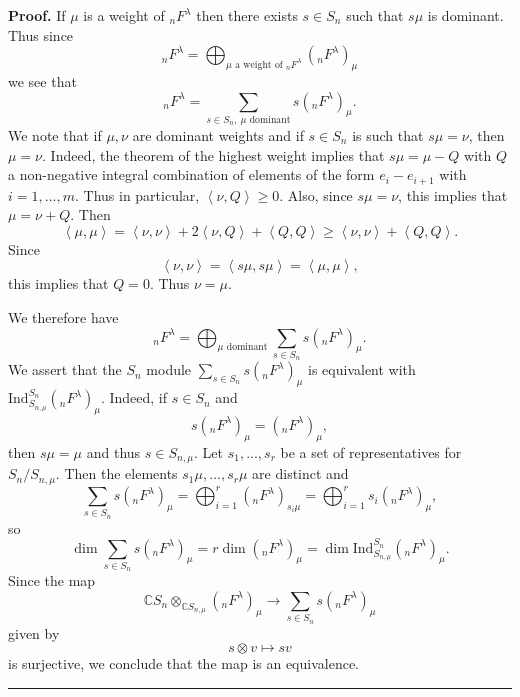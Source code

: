 \documentclass[12pt]{article}%
\newenvironment{proof}[1][Proof]{\noindent\textbf{#1.} }{\ \rule{0.5em}{0.5em}}
\begin{document}
\begin{proof}
If $\mu$ is a weight of ${}_{n}F^{\lambda}$ then there exists $s\in S_{n}$
such that $s\mu$ is dominant. Thus since
\[
{}_{n}F^{\lambda}=\bigoplus_{\mu\text{ a weight of }{}_{n}F^{\lambda}}({}%
_{n}F^{\lambda})_{\mu}%
\]
we see that%
\[
{}_{n}F^{\lambda}=\sum_{s\in S_{n},\ \mu\text{ dominant}}s({}_{n}F^{\lambda
})_{\mu}.
\]
We note that if $\mu,\nu$ are dominant weights and if $s\in S_{n}$ is such
that $s\mu=\nu$, then $\mu=\nu$. Indeed, the theorem of the highest weight
implies that $s\mu=\mu-Q$ with $Q$ a non-negative integral combination of
elements of the form $e_{i}-e_{i+1}$ with $i=1,...,m$. Thus in particular,
$\left\langle \nu,Q\right\rangle \geq0$. Also, since $s\mu=\nu$, this implies
that $\mu=\nu+Q$. Then
\[
\left\langle \mu,\mu\right\rangle =\left\langle \nu,\nu\right\rangle
+2\left\langle \nu,Q\right\rangle +\left\langle Q,Q\right\rangle
\geq\left\langle \nu,\nu\right\rangle +\left\langle Q,Q\right\rangle .
\]
Since
\[
\left\langle \nu,\nu\right\rangle =\left\langle s\mu,s\mu\right\rangle
=\left\langle \mu,\mu\right\rangle ,
\]
this implies that $Q=0$. Thus $\nu=\mu$.

We therefore have%
\[
{}_{n}F^{\lambda}=\bigoplus_{\mu\text{ dominant}}\sum_{s\in S_{n}}s({}%
_{n}F^{\lambda})_{\mu}.
\]
We assert that the $S_{n}$ module $\sum_{s\in S_{n}}s({}_{n}F^{\lambda})_{\mu
}$ is equivalent with $\mathrm{Ind}_{S_{n,\mu}}^{S_{n}}({}_{n}F^{\lambda
})_{\mu}$. Indeed, if $s\in S_{n}$ and
\[
s({}_{n}F^{\lambda})_{\mu}=({}_{n}F^{\lambda})_{\mu},
\]
then $s\mu=\mu$ and thus $s\in S_{n,\mu}$. Let $s_{1},...,s_{r}$ be a set of
representatives for $S_{n}/S_{n,\mu}$. Then the elements $s_{1}\mu
,...,s_{r}\mu$ are distinct and%
\[
\sum_{s\in S_{n}}s({}_{n}F^{\lambda})_{\mu}=\bigoplus_{i=1}^{r}({}%
_{n}F^{\lambda})_{s_{i}\mu}=\bigoplus_{i=1}^{r}s_{i}({}_{n}F^{\lambda})_{\mu},
\]
so
\[
\dim\sum_{s\in S_{n}}s({}_{n}F^{\lambda})_{\mu}=r\dim({}_{n}F^{\lambda})_{\mu
}=\dim\mathrm{Ind}_{S_{n,\mu}}^{S_{n}}({}_{n}F^{\lambda})_{\mu}.
\]
Since the map%
\[
\mathbb{C}S_{n}\otimes_{\mathbb{C}S_{n,\mu}}({}_{n}F^{\lambda})_{\mu
}\rightarrow\sum_{s\in S_{n}}s({}_{n}F^{\lambda})_{\mu}%
\]
given by%
\[
s\otimes v\mapsto sv
\]
is surjective, we conclude that the map is an equivalence.
\end{proof}
\end{document}

